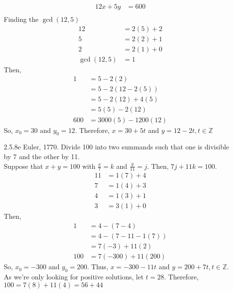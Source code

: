 \documentclass[12pt]{article}
\newcommand{\Z}{\mathds{Z}}
\begin{document}
\begin{enumerate}
\begin{align*}
	    12x + 5y &= 600\\
    \end{align*}
    Finding the $ \gcd(12,5) $
    \begin{align*}
	    12 &= 2(5) + 2\\
	    5  &= 2(2) + 1\\
	    2  &= 2(1) + 0\\
	    \gcd(12,5) &= 1
    \end{align*}
    Then,
    \begin{align*}
    	1 &= 5 - 2(2)\\
    	  &= 5 - 2(12-2(5))\\
    	  &= 5 - 2(12) + 4(5)\\
    	  &= 5(5) - 2(12)\\
      600 &= 3000(5)-1200(12)
    \end{align*}
    So, $ x_0 = 30 $ and $ y_0 = 12 $. Therefore, $ x=30+5t $ and $ y=12-2t ,t\in\Z $
    \item[2.5.8e] Euler, 1770. Divide 100 into two summands such that one is divisible by 7 and the other by 11.\\
    Suppose that $ x+y=100 $ with $ \frac{x}{7} = k $ and $ \frac{y}{11}=j $. Then, $ 7j+11k=100 $.
    \begin{align*}
	    11 &= 1(7) + 4\\
	    7  &= 1(4) + 3\\
	    4  &= 1(3) + 1\\
	    3  &= 3(1) + 0	    
    \end{align*}
    Then,
    \begin{align*}
	    1 &= 4-(7-4)\\
	      &= 4-(7-11-1(7))\\
	      &= 7(-3) + 11(2)\\
	  100 &= 7(-300) + 11(200)
    \end{align*}
    So, $ x_0 = -300 $ and $ y_0=200 $. Thus, $ x=-300-11t $ and $ y=200+7t, t\in\Z $. As we're only looking for positive solutions, let $ t= 28 $. Therefore, $ 100 = 7(8)+11(4) = 56+44 $
\end{enumerate}
\end{document}
